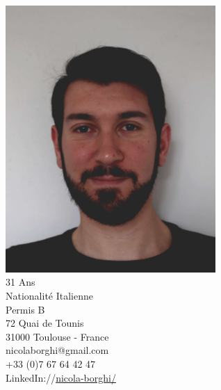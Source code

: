 \documentclass[]{deedy-resume-openfont}
\begin{document}
%
%


%
%



%
%

\begin{minipage}[t]{0.37\textwidth} 


\section{}
\includegraphics[width=0.6\textwidth]{IMG_2009.JPG}\\
31 Ans \\
Nationalité Italienne \\
Permis B \\
72 Quai de Tounis \\
31000 Toulouse - France \\
nicolaborghi@gmail.com \\
+33 (0)7 67 64 42 47 \\
LinkedIn://\href{https://www.linkedin.com/in/nicola-borghi/?locale=fr_FR}{nicola-borghi/} \\


\end{minipage}
\end{document}
